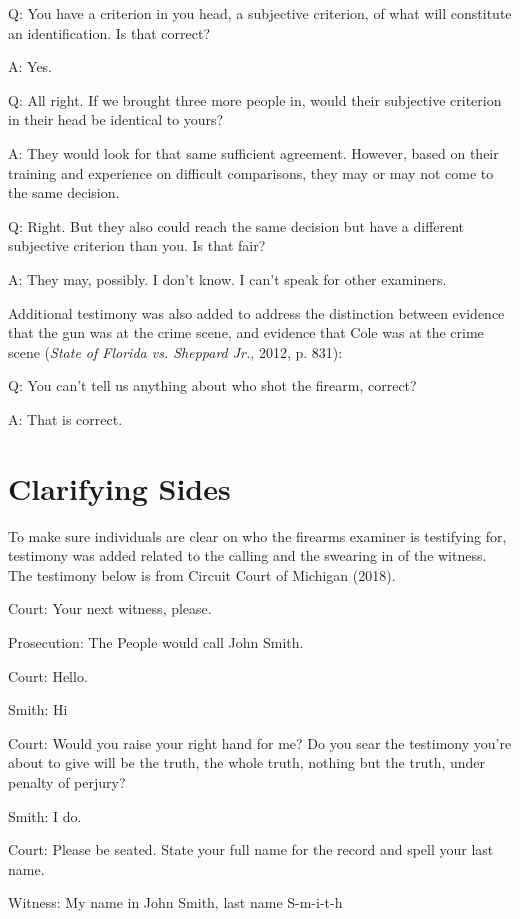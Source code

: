 \documentclass[print]{nuthesis}
\begin{document}
Q: You have a criterion in you head, a subjective criterion, of what will constitute an identification. Is that correct?

A: Yes.

Q: All right. If we brought three more people in, would their subjective criterion in their head be identical to yours?

A: They would look for that same sufficient agreement. However, based on their training and experience on difficult comparisons, they may or may not come to the same decision.

Q: Right. But they also could reach the same decision but have a different subjective criterion than you. Is that fair?

A: They may, possibly. I don't know. I can't speak for other examiners.

Additional testimony was also added to address the distinction between evidence that the gun was at the crime scene, and evidence that Cole was at the crime scene (\emph{State of {Florida} vs. Sheppard {Jr.}}, 2012, p. 831):

Q: You can't tell us anything about who shot the firearm, correct?

A: That is correct.

\hypertarget{clarifying-sides}{%
\section{Clarifying Sides}\label{clarifying-sides}}

To make sure individuals are clear on who the firearms examiner is testifying for, testimony was added related to the calling and the swearing in of the witness. The testimony below is from Circuit Court of Michigan (2018).

Court: Your next witness, please.

Prosecution: The People would call John Smith.

Court: Hello.

Smith: Hi

Court: Would you raise your right hand for me? Do you sear the testimony you're about to give will be the truth, the whole truth, nothing but the truth, under penalty of perjury?

Smith: I do.

Court: Please be seated. State your full name for the record and spell your last name.

Witness: My name in John Smith, last name S-m-i-t-h
\end{document}
